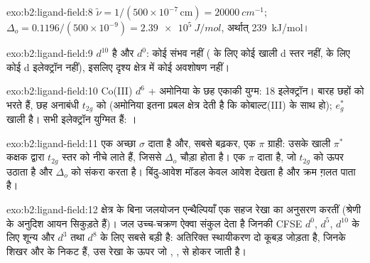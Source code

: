 \begin{solution}{exo:b2:ligand-field:8}
$\tilde\nu = 1/(500 \times 10^{-7}\,\text{cm}) = \qty{20000}{cm^{-1}}$; $\Delta_o =
0.1196/(500 \times 10^{-9}) = \qty{2.39e5}{J/mol}$, अर्थात् \qty{239}{kJ/mol}।
\end{solution}

\begin{solution}{exo:b2:ligand-field:9}
 $d^{10}$ है और  $d^0$: कोई  संभव नहीं ( के लिए
कोई खाली d स्तर नहीं,  के लिए कोई d इलेक्ट्रॉन नहीं), इसलिए दृश्य क्षेत्र में कोई अवशोषण नहीं।
\end{solution}

\begin{solution}{exo:b2:ligand-field:10}
Co(III) $d^6$ + अमोनिया के छह एकाकी युग्म: 18 इलेक्ट्रॉन। बारह छहों  को भरते हैं,
छह अनाबंधी $t_{2g}$ को (अमोनिया इतना प्रबल क्षेत्र देती है कि कोबाल्ट(III) के साथ
 हो); $e_g^*$ खाली है। सभी इलेक्ट्रॉन युग्मित हैं: ।
\end{solution}

\begin{solution}{exo:b2:ligand-field:11}
 एक अच्छा $\sigma$ दाता है और, सबसे बढ़कर, एक $\pi$ ग्राही: उसके खाली $\pi^*$ कक्षक
 द्वारा $t_{2g}$ स्तर को नीचे लाते हैं, जिससे $\Delta_o$ चौड़ा होता है।  एक $\pi$ दाता है, जो
$t_{2g}$ को ऊपर उठाता है और $\Delta_o$ को संकरा करता है। बिंदु-आवेश मॉडल केवल आवेश देखता है और
क्रम ग़लत पाता है।
\end{solution}

\begin{solution}{exo:b2:ligand-field:12}
क्षेत्र के बिना जलयोजन एन्थैल्पियाँ एक सहज रेखा का अनुसरण करतीं (श्रेणी के अनुदिश आयन
सिकुड़ते हैं)। जल उच्च-चक्रण ऐक्वा संकुल देता है जिनकी CFSE $d^0$, $d^5$, $d^{10}$ के लिए शून्य
और $d^3$ तथा $d^8$ के लिए सबसे बड़ी है: अतिरिक्त स्थायीकरण दो कूबड़ जोड़ता है, जिनके शिखर
 और  के निकट हैं, उस रेखा के ऊपर जो , ,  से होकर जाती है।
\end{solution}

